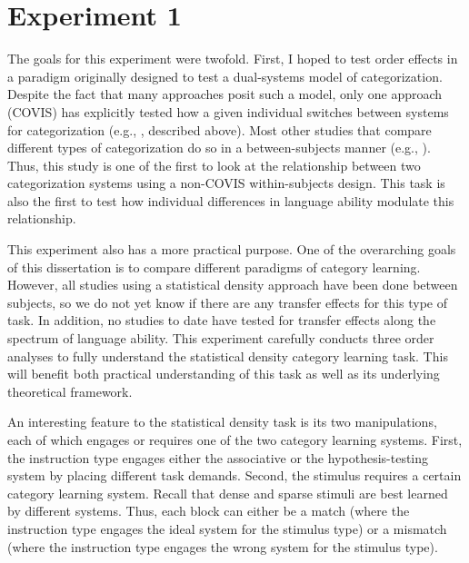 \documentclass[../dissertation.tex]{subfiles}
\begin{document}
\section{Experiment 1}

The goals for this experiment were twofold. First, I hoped to test order effects in a paradigm originally designed to test a dual-systems model of categorization. Despite the fact that many approaches posit such a model, only one approach (COVIS) has explicitly tested how a given individual switches between systems for categorization (e.g., \citealp{Ashby2010, Erickson2008}, described above). Most other studies that compare different types of categorization do so in a between-subjects manner (e.g., \citet{Kloos2008}). Thus, this study is one of the first to look at the relationship between two categorization systems using a non-COVIS within-subjects design. This task is also the first to test how individual differences in language ability modulate this relationship. \par
	This experiment also has a more practical purpose. One of the overarching goals of this dissertation is to compare different paradigms of category learning. However, all studies using a statistical density approach have been done between subjects, so we do not yet know if there are any transfer effects for this type of task. In addition, no studies to date have tested for transfer effects along the spectrum of language ability. This experiment carefully conducts three order analyses to fully understand the statistical density category learning task. This will benefit both  practical understanding of this task as well as its underlying theoretical framework. \par
	An interesting feature to the statistical density task is its two manipulations, each of which engages or requires one of the two category learning systems. First, the instruction type engages either the associative or the hypothesis-testing system by placing different task demands. Second, the stimulus requires a certain category learning system. Recall that dense and sparse stimuli are best learned by different systems. Thus, each block can either be a match (where the instruction type engages the ideal system for the stimulus type) or a mismatch (where the instruction type engages the wrong system for the stimulus type). \par 
\end{document}
